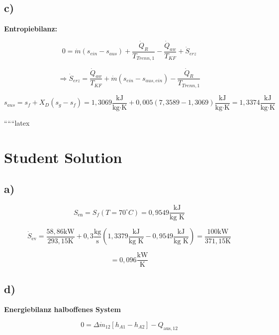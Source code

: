 \subsection*{c)}

\textbf{Entropiebilanz:}

\begin{equation*}
0 = \dot{m} (s_{ein} - s_{aus}) + \frac{\dot{Q}_R}{T_{Trenn,1}} - \frac{\dot{Q}_{aw}}{T_{KF}} + \dot{S}_{erz}
\end{equation*}

\begin{equation*}
\Rightarrow \dot{S}_{erz} = \frac{\dot{Q}_{aw}}{T_{KF}} + \dot{m} \left( s_{ein} - s_{aus,ein} \right) - \frac{\dot{Q}_R}{T_{Trenn,1}}
\end{equation*}

\begin{equation*}
s_{aus} = s_f + X_D (s_g - s_f) = 1,3069 \frac{\text{kJ}}{\text{kg} \cdot \text{K}} + 0,005 (7,3589 - 1,3069) \frac{\text{kJ}}{\text{kg} \cdot \text{K}} = 1,3374 \frac{\text{kJ}}{\text{kg} \cdot \text{K}}
\end{equation*}

``````latex


\section*{Student Solution}

\subsection*{a)}

\[
S_{\text{en}} = S_f(T=70^\circ C) = 0{,}9549 \frac{\text{kJ}}{\text{kg K}}
\]

\[
\dot{S}_{\text{ev}} = \frac{58{,}86 \text{kW}}{293{,}15 \text{K}} + 0{,}3 \frac{\text{kg}}{\text{s}} \left(1{,}3379 \frac{\text{kJ}}{\text{kg K}} - 0{,}9549 \frac{\text{kJ}}{\text{kg K}}\right) = \frac{100 \text{kW}}{371{,}15 \text{K}}
\]

\[
= 0{,}096 \frac{\text{kW}}{\text{K}}
\]

\subsection*{d)}

\textbf{Energiebilanz halboffenes System}

\[
0 = \Delta \dot{m}_{12} \left[ h_{A1} - h_{A2} \right] - Q_{\text{aus},12}
\]

